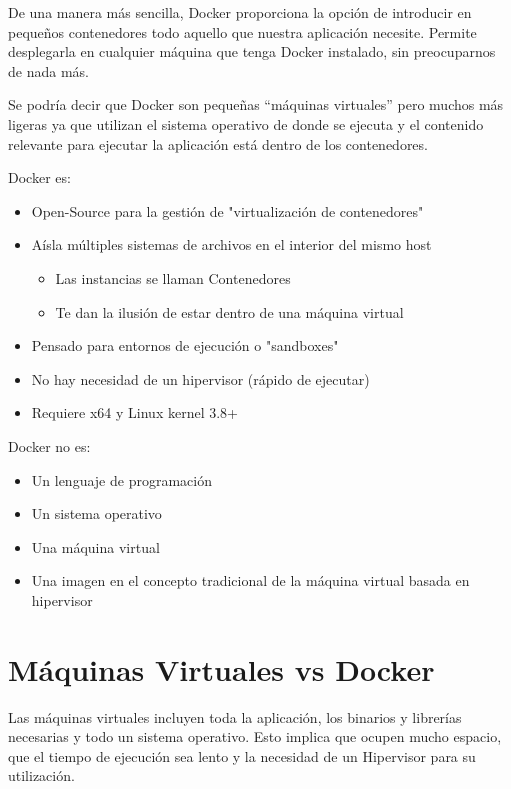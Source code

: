 De una manera más sencilla, Docker proporciona la opción de introducir
en pequeños contenedores todo aquello que nuestra aplicación necesite. Permite desplegarla en cualquier máquina que tenga Docker instalado, sin preocuparnos de nada más. 

Se podría decir que Docker son pequeñas “máquinas virtuales” pero muchos más ligeras ya que utilizan el sistema operativo de donde se ejecuta y el contenido relevante para ejecutar la aplicación está dentro de los contenedores.
\newline 

Docker es:

\begin{itemize}
\item Open-Source para la gestión de "virtualización de contenedores"
\item Aísla múltiples sistemas de archivos en el interior del mismo host
\begin{itemize}
\item Las instancias se llaman Contenedores
\item Te dan la ilusión de estar dentro de una máquina virtual
\end{itemize}
\item Pensado para entornos de ejecución o "sandboxes"
\item No hay necesidad de un hipervisor (rápido de ejecutar)
\item Requiere x64 y Linux kernel 3.8+
\end{itemize}
\pagebreak 
Docker no es:

\begin{itemize}
\item Un lenguaje de programación
\item Un sistema operativo
\item Una máquina virtual
\item Una imagen en el concepto tradicional de la máquina virtual basada en hipervisor
\end{itemize}

\section{Máquinas Virtuales vs Docker}

Las máquinas virtuales incluyen toda la aplicación, los binarios y librerías necesarias y todo un sistema operativo. Esto implica que ocupen mucho espacio, que el tiempo de ejecución sea lento y la necesidad de un Hipervisor para su utilización.

